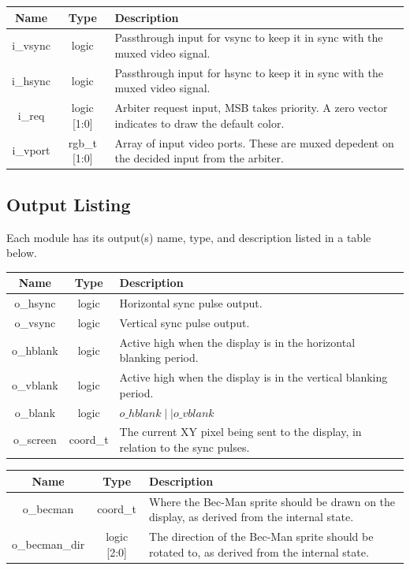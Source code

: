 \documentclass[12pt]{article}
\begin{document}
\vspace{0.5in}
\begingroup
{}
\label{tab:input_video_arbiter}
\begin{tabularx}{\linewidth}{ ||c|c|X|| }
    \hline
    Name & Type & Description \\
    \hline
    i\_vsync & logic & Passthrough input for vsync to keep it in sync with the
    muxed video signal. \\
    i\_hsync & logic & Passthrough input for hsync to keep it in sync with the
    muxed video signal. \\
    i\_req & logic [1:0] & Arbiter request input, MSB takes priority. A zero
    vector indicates to draw the default color. \\
    i\_vport & rgb\_t [1:0] & Array of input video ports. These are muxed
    depedent on the decided input from the arbiter. \\
    \hline
\end{tabularx}
\endgroup

%
%
\subsection{Output Listing}
Each module has its output(s) name, type, and description listed in a table
below.

\begingroup
{}
\label{tab:output_vtg}
\begin{tabularx}{\linewidth}{ ||c|c|X|| }
    \hline
    Name & Type & Description \\
    \hline
    o\_hsync & logic & Horizontal sync pulse output. \\
    o\_vsync & logic & Vertical sync pulse output. \\
    o\_hblank & logic & Active high when the display is in the horizontal blanking
    period. \\
    o\_vblank & logic & Active high when the display is in the vertical blanking
    period. \\
    o\_blank & logic & $o\_hblank \mid \mid o\_vblank$ \\
    o\_screen & coord\_t & The current XY pixel being sent to the display, in
    relation to the sync pulses. \\
    \hline
\end{tabularx}
\endgroup

\vspace{0.5in}
\begingroup
{}
\label{tab:output_game_state}
\begin{tabularx}{\linewidth}{ ||c|c|X|| }
    \hline
    Name & Type & Description \\
    \hline
    o\_becman & coord\_t & Where the Bec-Man sprite should be drawn on the
    display, as derived from the internal state. \\
    o\_becman\_dir & logic [2:0] & The direction of the Bec-Man sprite should be
    rotated to, as derived from the internal state. \\
    \hline
\end{tabularx}
\endgroup
\end{document}
